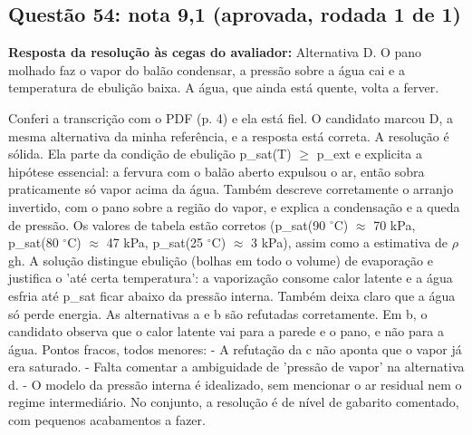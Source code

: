 \documentclass{article}%
\begin{document}
\subsection*{Questão 54: nota 9,1 (aprovada, rodada 1 de 1)}%
\textbf{Resposta da resolução às cegas do avaliador:} Alternativa D. O pano molhado faz o vapor do balão condensar, a pressão sobre a água cai e a temperatura de ebulição baixa. A água, que ainda está quente, volta a ferver.\par %
Conferi a transcrição com o PDF (p. 4) e ela está fiel. O candidato marcou D, a mesma alternativa da minha referência, e a resposta está correta.\newline%
\newline%
A resolução é sólida. Ela parte da condição de ebulição p\_sat(T) $\geq$ p\_ext e explicita a hipótese essencial: a fervura com o balão aberto expulsou o ar, então sobra praticamente só vapor acima da água. Também descreve corretamente o arranjo invertido, com o pano sobre a região do vapor, e explica a condensação e a queda de pressão. Os valores de tabela estão corretos (p\_sat(90 $^\circ$C) $\approx$ 70 kPa, p\_sat(80 $^\circ$C) $\approx$ 47 kPa, p\_sat(25 $^\circ$C) $\approx$ 3 kPa), assim como a estimativa de $\rho$gh. A solução distingue ebulição (bolhas em todo o volume) de evaporação e justifica o 'até certa temperatura': a vaporização consome calor latente e a água esfria até p\_sat ficar abaixo da pressão interna. Também deixa claro que a água só perde energia.\newline%
\newline%
As alternativas a e b são refutadas corretamente. Em b, o candidato observa que o calor latente vai para a parede e o pano, e não para a água.\newline%
\newline%
Pontos fracos, todos menores:\newline%
{-} A refutação da c não aponta que o vapor já era saturado.\newline%
{-} Falta comentar a ambiguidade de 'pressão de vapor' na alternativa d.\newline%
{-} O modelo da pressão interna é idealizado, sem mencionar o ar residual nem o regime intermediário.\newline%
\newline%
No conjunto, a resolução é de nível de gabarito comentado, com pequenos acabamentos a fazer.%
\end{document}
